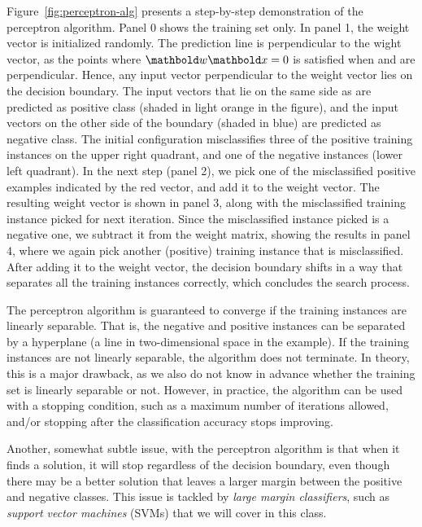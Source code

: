 Figure~\ref{fig:perceptron-alg} presents a step-by-step demonstration
of the perceptron algorithm.
Panel 0 shows the training set only.
In panel 1, the weight vector is initialized randomly.
The prediction line is perpendicular to the wight vector,
as the points where $\vect{w}\vect{x} = 0$ is satisfied when 
 and  are perpendicular.
Hence, any input vector perpendicular to the weight vector
lies on the decision boundary.
The input vectors that lie  on the  same side
as  are predicted as positive class
(shaded in light orange in the figure),
and the input vectors on the other side of the boundary 
(shaded in blue) are predicted as negative class.
The initial configuration misclassifies three of the positive training instances
on the upper right quadrant,
and one of the negative instances (lower left quadrant). 
In the next step (panel 2),
we pick one of the misclassified positive examples indicated by the red vector,
and add it to the weight vector.%
The resulting weight vector is shown in panel 3,
along with the misclassified training instance picked for next iteration.
Since the misclassified instance picked is a negative one,
we subtract it from the weight matrix, showing the results in panel 4,
where we again pick another (positive) training instance that is misclassified.
After adding it to the weight vector,
the decision boundary shifts in a way that separates all the training instances correctly,
which concludes the search process.

The perceptron algorithm is guaranteed to converge
if the training instances are linearly separable.
That is, the negative and positive instances
can be separated by a hyperplane
(a line in two-dimensional space in the example).
If the training instances are not linearly separable,
the algorithm does not terminate.
In theory, this is a major drawback,
as we also do not know in advance whether the training set is 
linearly separable or not.
However, in practice,
the algorithm can be used with a stopping condition,
such as a maximum number of iterations allowed,
and/or stopping after the classification accuracy stops improving.

Another, somewhat subtle issue, with the perceptron algorithm is that
when it finds a solution, it will stop regardless of the decision boundary,
even though there may be a better solution
that leaves a larger margin between the positive and negative classes.
This issue is tackled by \emph{large margin classifiers},
such as \emph{support vector machines} (SVMs) that we will cover in this class.%


